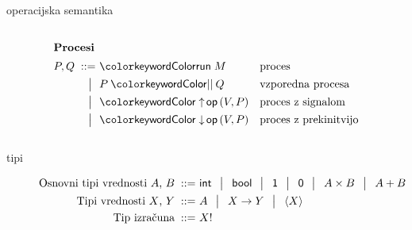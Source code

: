 \documentclass{beamer}
\theoremstyle{definition} %
\theoremstyle{plain} %
\begin{document}
\begin{frame}{operacijska semantika}
\begin{columns}[T]
			\begin{column}{0.42\textwidth}
				\begin{figure}[hp]
					\parbox{\textwidth}{
						\centering
						\tiny
						\begin{align*}
						\intertext{\textbf{Procesi}}
						P, Q
						\bnfis & \tmrun M & & \text{proces} \\
						\bnfor & \tmpar P Q & & \text{vzporedna procesa} \\
						\bnfor & \tmopout{op}{V}{P} & & \text{proces z signalom} \\
						\bnfor & \tmopin{op}{V}{P}  & & \text{proces z prekinitvijo}
						\end{align*}
					} 
				\end{figure}
			\end{column}
		\end{columns}	
	\end{frame}

	\begin{frame}{tipi}
		\begin{figure}[tb]
			\parbox{\textwidth}{
				\centering
				\small
				\begin{align*}
				\text{Osnovni tipi vrednosti $A$, $B$}
				\bnfis& \tysym{int} \,\bnfor\! \tysym{bool} \,\bnfor\! \tyunit \,\bnfor\! \tyempty \,\bnfor\! \typrod{A}{B} \,\bnfor\! \tysum{A}{B}
				\\%
				\text{Tipi vrednosti $X$, $Y$}
				\bnfis& A \,\bnfor\! \tyfun{X}{Y} \,\bnfor\! \typromise{X}
				\\
				\text{Tip izračuna} \bnfis& \tycomp{X}
				\end{align*}
			}
		\end{figure}
	\end{frame}
\end{document}
